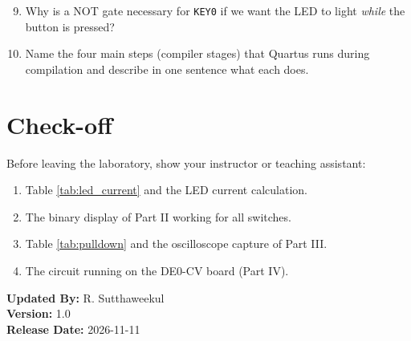 \documentclass{article}
\begin{document}
\begin{enumerate}
    \setcounter{enumi}{8}
    \item Why is a NOT gate necessary for \texttt{KEY0} if we want the LED to light \emph{while} the button is pressed?
    \item Name the four main steps (compiler stages) that Quartus runs during compilation and describe in one sentence what each does.
\end{enumerate}

\section*{Check-off}
Before leaving the laboratory, show your instructor or teaching assistant:
\begin{enumerate}
    \item Table \ref{tab:led_current} and the LED current calculation.
    \item The binary display of Part II working for all switches.
    \item Table \ref{tab:pulldown} and the oscilloscope capture of Part III.
    \item The circuit running on the DE0-CV board (Part IV).
\end{enumerate}

\vspace{1cm}
\noindent \textbf{Updated By:} R. Sutthaweekul \\
\textbf{Version:} 1.0 \\
\textbf{Release Date:} 2026-11-11
\end{document}
